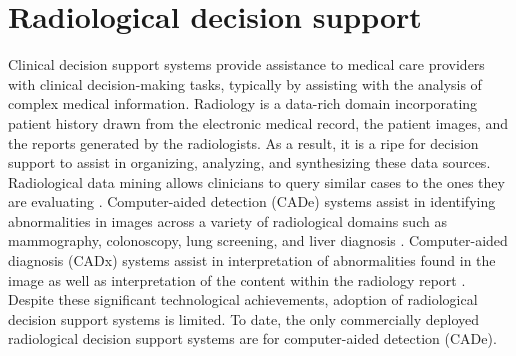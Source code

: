 \section{Radiological decision support}
Clinical decision support systems provide assistance to medical care providers with clinical decision-making tasks, typically by assisting with the analysis of complex medical information.
Radiology is a data-rich domain incorporating patient history drawn from the electronic medical record, the patient images, and the reports generated by the radiologists.
As a result, it is a ripe for decision support to assist in organizing, analyzing, and synthesizing these data sources.
Radiological data mining allows clinicians to query similar cases to the ones they are evaluating \cite{Shin:2015wl,Bozkurt:2014jw,Depeursinge:2012ce,Korenblum:2011gx,Akgul:2011ey,Nassif:2009du}.
Computer-aided detection (CADe) systems assist in identifying abnormalities in images across a variety of radiological domains such as mammography, colonoscopy, lung screening, and liver diagnosis \cite{Cheng:2003ig,Castellino:2005ke,Meeuwis:2010bv,Oliver:2010fm,Fenton:2011fw,Fenton:2012kz,Jamieson:2012hz,Gallas:2012eg,Giger:2013jb}.
Computer-aided diagnosis (CADx) systems assist in interpretation of abnormalities found in the image \cite{Jiang:1999fj,ElizabethS:2005gc,Gallas:2012eg,Bright:2012ga,Giger:2013jb,Depeursinge:2010jl,Fujita:2008it,Eadie:2011cv,Rubin:2005jg,Garg:2005cb,Elter:2009fv,Jamieson:2010vl,Jamieson:2010tt,Cheng:2003ig,Jiang:2001fy} as well as interpretation of the content within the radiology report \cite{Burnside:2000wl,ElizabethS:2005gc,Burnside:2009br,Rubin:2005jg}.
Despite these significant technological achievements, adoption of radiological decision support systems is limited.
To date, the only commercially deployed radiological decision support systems are for computer-aided detection (CADe).

